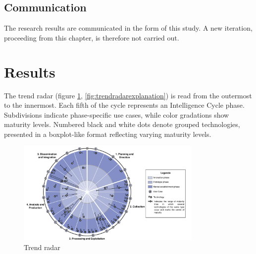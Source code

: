 \documentclass[10pt]{article}
\begin{document}
\subsection{Communication}

The research results are communicated in the form of this study.
A new iteration, proceeding from this chapter, is therefore not
carried out.

\section{Results} \label{sec:results}

The trend radar (figure \ref{fig:trendradar}, \ref{fig:trendradarexplanation}) is read from the outermost to the innermost.
Each fifth of the cycle represents an Intelligence Cycle phase. Subdivisions indicate
phase-specific use cases, while color gradations show maturity levels. Numbered black
and white dots denote grouped technologies, presented in a boxplot-like format reflecting
varying maturity levels.

\begin{figure}[thb]
    \centering
    \includegraphics[width=0.8\textwidth]{PDF/images/crop_Trendradar}
    \caption{Trend radar}
    \label{fig:trendradar}
\end{figure}

\begin{figure}[!thb]
    \centering
\end{figure}
\end{document}
